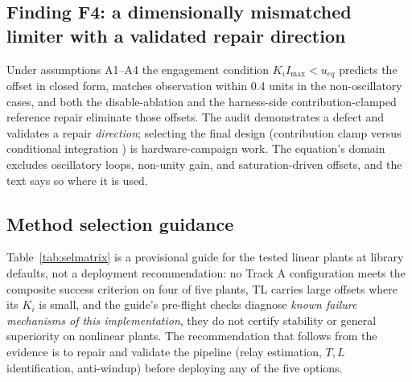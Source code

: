 \documentclass[10pt,twocolumn]{article}
\begin{document}
\subsection{Finding F4: a dimensionally mismatched limiter with a validated repair direction}

Under assumptions A1--A4 the engagement condition $K_i I_{\max} < u_{eq}$ predicts the offset in closed form, matches observation within 0.4 units in the non-oscillatory cases, and both the disable-ablation and the harness-side contribution-clamped reference repair eliminate those offsets. The audit demonstrates a defect and validates a repair \emph{direction}; selecting the final design (contribution clamp versus conditional integration \cite{astrom2006, visioli2006}) is hardware-campaign work. The equation's domain excludes oscillatory loops, non-unity gain, and saturation-driven offsets, and the text says so where it is used.

\subsection{Method selection guidance}

Table~\ref{tab:selmatrix} is a provisional guide for the tested linear plants at library defaults, not a deployment recommendation: no Track A configuration meets the composite success criterion on four of five plants, TL carries large offsets where its $K_i$ is small, and the guide's pre-flight checks diagnose \emph{known failure mechanisms of this implementation}, they do not certify stability or general superiority on nonlinear plants. The recommendation that follows from the evidence is to repair and validate the pipeline (relay estimation, $T,L$ identification, anti-windup) before deploying any of the five options.
\end{document}
